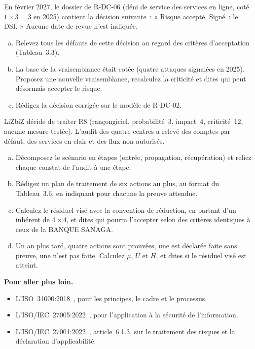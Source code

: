 \begin{boxexo}[title={\ding{45}\quad Exercice~3.3. Une acceptation contestable \niveaumoyen}]
En février 2027, le dossier de R-DC-06 (déni de service des services en
ligne, coté $1 \times 3 = 3$ en 2025) contient la décision suivante~:
« Risque accepté. Signé~: le DSI. » Aucune date de revue n'est indiquée.
\begin{enumerate}[(a)]
    \item Relevez tous les défauts de cette décision au regard des critères
          d'acceptation (Tableau~3.3).
    \item La base de la vraisemblance était cotée \NON{} (quatre attaques
          signalées en 2025). Proposez une nouvelle vraisemblance, recalculez
          la criticité et dites qui peut désormais accepter le risque.
    \item Rédigez la décision corrigée sur le modèle de R-DC-02.
\end{enumerate}
\end{boxexo}

\begin{boxexo}[title={\ding{45}\quad Exercice~3.4. Le plan de traitement de R8 \niveauexpert}]
LiZbiZ décide de traiter R8 (rançongiciel, probabilité~3, impact~4,
criticité~12, aucune mesure testée). L'audit des quatre centres a relevé
des comptes par défaut, des services en clair et des flux non autorisés.
\begin{enumerate}[(a)]
    \item Décomposez le scénario en étapes (entrée, propagation,
          récupération) et reliez chaque constat de l'audit à une étape.
    \item Rédigez un plan de traitement de six actions au plus, au format du
          Tableau~3.6, en indiquant pour chacune la preuve attendue.
    \item Calculez le résiduel visé avec la convention de réduction, en
          partant d'un inhérent de $4 \times 4$, et dites qui pourra
          l'accepter selon des critères identiques à ceux de la BANQUE
          SANAGA.
    \item Un an plus tard, quatre actions sont prouvées, une est déclarée
          faite sans preuve, une n'est pas faite. Calculez $\mu$, $U$ et
          $H$, et dites si le résiduel visé est atteint.
\end{enumerate}
\end{boxexo}

\bigskip

\begin{boxinfo}
\textbf{Pour aller plus loin.}
\begin{itemize}
    \item L'ISO~31000:2018~\cite{iso31000_2018}, pour les principes, le
          cadre et le processus.
    \item L'ISO/IEC~27005:2022~\cite{iso27005_2022}, pour l'application à
          la sécurité de l'information.
    \item L'ISO/IEC~27001:2022~\cite{iso27001_2022}, article~6.1.3, sur le
          traitement des risques et la déclaration d'applicabilité.
\end{itemize}
\end{boxinfo}

